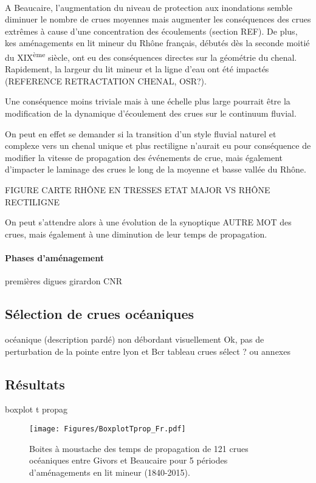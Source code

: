 \documentclass[11pt]{article}
\begin{document}
	\paragraph{} A Beaucaire, l'augmentation du niveau de protection aux inondations semble diminuer le nombre de crues moyennes mais augmenter les conséquences des crues extrêmes à cause d'une concentration des écoulements (section REF). De plus, kes aménagements en lit mineur du Rhône français, débutés dès la seconde moitié du XIX\textsuperscript{ème} siècle, ont eu des conséquences directes sur la géométrie du chenal. Rapidement, la largeur du lit mineur et la ligne d'eau ont été impactés (REFERENCE RETRACTATION CHENAL, OSR?). 
	
	Une conséquence moins triviale mais à une échelle plus large pourrait être la modification de la dynamique d'écoulement des crues sur le continuum fluvial.
	
	 On peut en effet se demander si la transition d'un style fluvial naturel et complexe vers un chenal unique et plus rectiligne n'aurait eu pour conséquence de modifier la vitesse de propagation des événements de crue, mais également d'impacter le laminage des crues le long de la moyenne et basse vallée du Rhône. 
	
	FIGURE CARTE RHÔNE EN TRESSES ETAT MAJOR VS RHÔNE RECTILIGNE
	
	
	 On peut s'attendre alors à une évolution de la synoptique AUTRE MOT des crues, mais également à une diminution de leur temps de propagation. 
	
	\paragraph{Phases d'aménagement}
		premières digues
		girardon
		CNR
		
	\subsection{Sélection de crues océaniques}
	océanique (description pardé)
	non débordant
	visuellement Ok, pas de perturbation de la pointe entre lyon et Bcr
	tableau crues sélect ? ou annexes
	
	\subsection{Résultats}
	boxplot t propag

	\begin{figure}[h]
	\centering
		\texttt{[image: Figures/BoxplotTprop\_Fr.pdf]}
        \caption{Boites à moustache des temps de propagation de 121 crues océaniques entre Givors et Beaucaire pour 5 périodes d'aménagements en lit mineur (1840-2015).}
		\label{fig:BoxplotPropag}
	\end{figure}	
	
\end{document}
